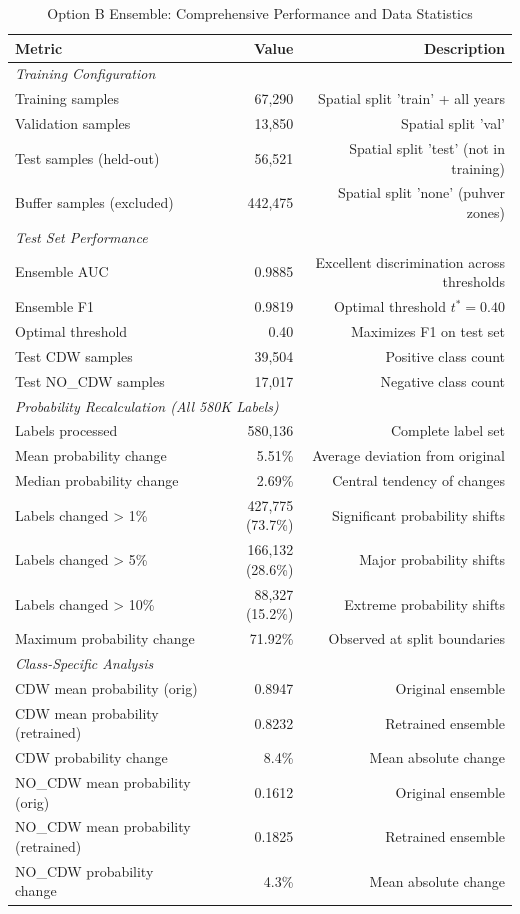\begin{table}[H]
\centering
\caption{Option B Ensemble: Comprehensive Performance and Data Statistics}
\label{tab:option_b_statistics}
\begin{tabular}{lrr}
\hline
Metric & Value & Description \\
\hline
\multicolumn{3}{l}{\emph{Training Configuration}} \\
Training samples & 67,290 & Spatial split 'train' + all years \\
Validation samples & 13,850 & Spatial split 'val' \\
Test samples (held-out) & 56,521 & Spatial split 'test' (not in training) \\
Buffer samples (excluded) & 442,475 & Spatial split 'none' (puhver zones) \\
\hline
\multicolumn{3}{l}{\emph{Test Set Performance}} \\
Ensemble AUC & 0.9885 & Excellent discrimination across thresholds \\
Ensemble F1 & 0.9819 & Optimal threshold $t^* = 0.40$ \\
Optimal threshold & 0.40 & Maximizes F1 on test set \\
Test CDW samples & 39,504 & Positive class count \\
Test NO\_CDW samples & 17,017 & Negative class count \\
\hline
\multicolumn{3}{l}{\emph{Probability Recalculation (All 580K Labels)}} \\
Labels processed & 580,136 & Complete label set \\
Mean probability change & 5.51\% & Average deviation from original \\
Median probability change & 2.69\% & Central tendency of changes \\
Labels changed > 1\% & 427,775 (73.7\%) & Significant probability shifts \\
Labels changed > 5\% & 166,132 (28.6\%) & Major probability shifts \\
Labels changed > 10\% & 88,327 (15.2\%) & Extreme probability shifts \\
Maximum probability change & 71.92\% & Observed at split boundaries \\
\hline
\multicolumn{3}{l}{\emph{Class-Specific Analysis}} \\
CDW mean probability (orig) & 0.8947 & Original ensemble \\
CDW mean probability (retrained) & 0.8232 & Retrained ensemble \\
CDW probability change & 8.4\% & Mean absolute change \\
NO\_CDW mean probability (orig) & 0.1612 & Original ensemble \\
NO\_CDW mean probability (retrained) & 0.1825 & Retrained ensemble \\
NO\_CDW probability change & 4.3\% & Mean absolute change \\
\hline
\end{tabular}
\end{table}

